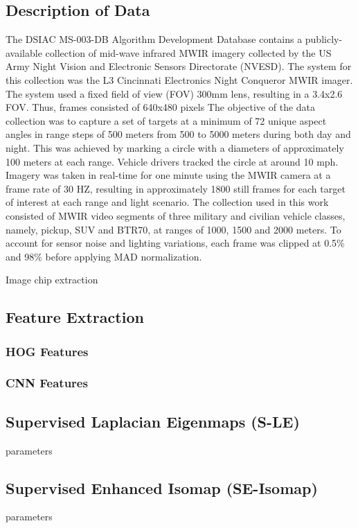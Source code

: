 \subsection{Description of Data}
The DSIAC MS-003-DB Algorithm Development Database \citep{DSIACATR} contains a publicly-available collection of mid-wave infrared MWIR imagery collected by the US Army Night Vision and Electronic Sensors Directorate (NVESD). The system for this collection was the L3 Cincinnati Electronics Night Conqueror MWIR imager. The system used a fixed field of view (FOV) 300mm lens, resulting in a 3.4x2.6 FOV.  Thus, frames consisted of 640x480 pixels  The objective of the data collection was to capture a set of targets at a minimum of 72 unique aspect angles in range steps of 500 meters from 500 to 5000 meters during both day and night.  This was achieved by marking a circle with a diameters of approximately 100 meters at each range.  Vehicle drivers tracked the circle at around 10 mph. Imagery was taken in real-time for one minute using the  MWIR camera at a frame rate of 30 HZ, resulting in approximately 1800 still frames for each target of interest at each range and light scenario.  The collection used in this work consisted of MWIR video segments of three military and civilian vehicle classes, namely, pickup, SUV and BTR70, at ranges of 1000, 1500 and 2000 meters.  To account for sensor noise and lighting variations,  each frame was clipped at 0.5\% and 98\% before applying MAD normalization.
 
Image chip extraction


\subsection{Feature Extraction}

\subsubsection{HOG Features}

\subsubsection{CNN Features}

\subsection{Supervised Laplacian Eigenmaps (S-LE)}
parameters

\subsection{Supervised Enhanced Isomap (SE-Isomap)}
parameters

